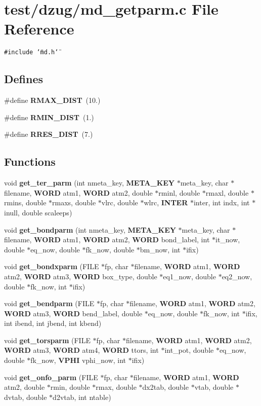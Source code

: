 \section{test/dzug/md\_\-getparm.c File Reference}
\label{test_2dzug_2md__getparm_8c}
{\tt \#include \char`\"{}md.h\char`\"{}}\par
\subsection*{Defines}
\begin{CompactItemize}
\item 
\#define {\bf RMAX\_\-DIST}~(10.)
\item 
\#define {\bf RMIN\_\-DIST}~(1.)
\item 
\#define {\bf RRES\_\-DIST}~(7.)
\end{CompactItemize}
\subsection*{Functions}
\begin{CompactItemize}
\item 
void {\bf get\_\-ter\_\-parm} (int nmeta\_\-key, {\bf META\_\-KEY} $\ast$meta\_\-key, char $\ast$filename, {\bf WORD} atm1, {\bf WORD} atm2, double $\ast$rminl, double $\ast$rmaxl, double $\ast$rmins, double $\ast$rmaxs, double $\ast$vlrc, double $\ast$wlrc, {\bf INTER} $\ast$inter, int indx, int $\ast$inull, double scaleeps)
\item 
void {\bf get\_\-bondparm} (int nmeta\_\-key, {\bf META\_\-KEY} $\ast$meta\_\-key, char $\ast$filename, {\bf WORD} atm1, {\bf WORD} atm2, {\bf WORD} bond\_\-label, int $\ast$it\_\-now, double $\ast$eq\_\-now, double $\ast$fk\_\-now, double $\ast$bm\_\-now, int $\ast$ifix)
\item 
void {\bf get\_\-bondxparm} (FILE $\ast$fp, char $\ast$filename, {\bf WORD} atm1, {\bf WORD} atm2, {\bf WORD} atm3, {\bf WORD} box\_\-type, double $\ast$eq1\_\-now, double $\ast$eq2\_\-now, double $\ast$fk\_\-now, int $\ast$ifix)
\item 
void {\bf get\_\-bendparm} (FILE $\ast$fp, char $\ast$filename, {\bf WORD} atm1, {\bf WORD} atm2, {\bf WORD} atm3, {\bf WORD} bend\_\-label, double $\ast$eq\_\-now, double $\ast$fk\_\-now, int $\ast$ifix, int ibend, int jbend, int kbend)
\item 
void {\bf get\_\-torsparm} (FILE $\ast$fp, char $\ast$filename, {\bf WORD} atm1, {\bf WORD} atm2, {\bf WORD} atm3, {\bf WORD} atm4, {\bf WORD} ttors, int $\ast$int\_\-pot, double $\ast$eq\_\-now, double $\ast$fk\_\-now, {\bf VPHI} vphi\_\-now, int $\ast$ifix)
\item 
void {\bf get\_\-onfo\_\-parm} (FILE $\ast$fp, char $\ast$filename, {\bf WORD} atm1, {\bf WORD} atm2, double $\ast$rmin, double $\ast$rmax, double $\ast$dx2tab, double $\ast$vtab, double $\ast$dvtab, double $\ast$d2vtab, int ntable)
\end{CompactItemize}


